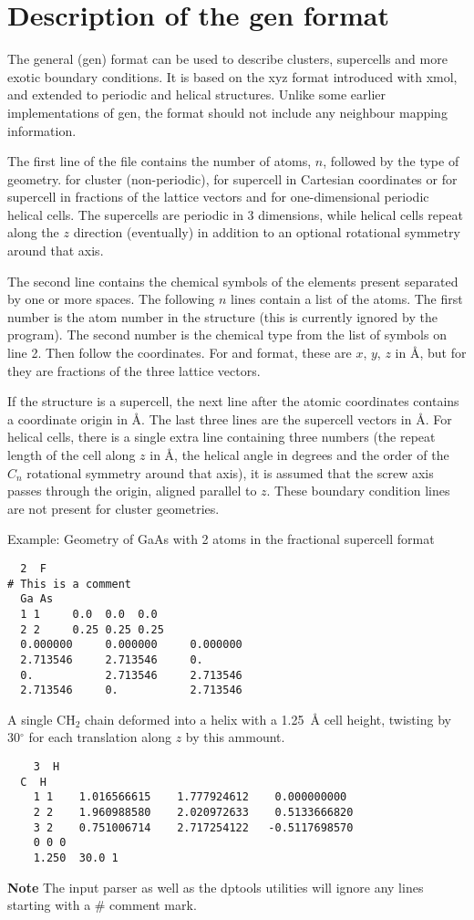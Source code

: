
\chapter{Description of the gen format}
\label{app:gen}

The general (gen) format can be used to describe clusters, supercells and more
exotic boundary conditions. It is based on the xyz format introduced with xmol,
and extended to periodic and helical structures. Unlike some earlier
implementations of gen, the format should not include any neighbour mapping
information.

The first line of the file contains the number of atoms, $n$, followed by the
type of geometry.  for cluster (non-periodic),  for supercell in
Cartesian coordinates or  for supercell in fractions of the lattice
vectors and  for one-dimensional periodic helical cells. The supercells
are periodic in 3 dimensions, while helical cells repeat along the $z$ direction
(eventually) in addition to an optional rotational symmetry around that axis.

The second line contains the chemical symbols of the elements present
separated by one or more spaces.  The following $n$ lines contain a
list of the atoms. The first number is the atom number in the
structure (this is currently ignored by the program). The second
number is the chemical type from the list of symbols on line 2. Then
follow the coordinates. For  and  format, these are $x$,
$y$, $z$ in {\AA}, but for  they are fractions of the three
lattice vectors.

If the structure is a supercell, the next line after the atomic coordinates
contains a coordinate origin in {\AA}. The last three lines are the supercell
vectors in {\AA}. For helical cells, there is a single extra line containing
three numbers (the repeat length of the cell along $z$ in {\AA}, the helical
angle in degrees and the order of the $C_n$ rotational symmetry around that
axis), it is assumed that the screw axis passes through the origin, aligned
parallel to $z$. These boundary condition lines are not present for cluster
geometries.

Example: Geometry of GaAs with 2 atoms in the fractional supercell
format
\begin{verbatim}
  2  F
# This is a comment
  Ga As
  1 1     0.0  0.0  0.0
  2 2     0.25 0.25 0.25
  0.000000     0.000000     0.000000
  2.713546     2.713546     0.      
  0.           2.713546     2.713546
  2.713546     0.           2.713546
\end{verbatim}

A single CH$_2$ chain deformed into a helix with a 1.25~{\AA} cell
height, twisting by 30$^\circ$ for each translation along $z$ by this
ammount.
\begin{verbatim}
    3  H
  C  H
    1 1    1.016566615    1.777924612    0.000000000
    2 2    1.960988580    2.020972633    0.5133666820
    3 2    0.751006714    2.717254122   -0.5117698570
    0 0 0
    1.250  30.0 1
\end{verbatim}

{\bf Note} The \dftbp{} input parser as well as the dptools utilities will
ignore any lines starting with a \# comment mark.
